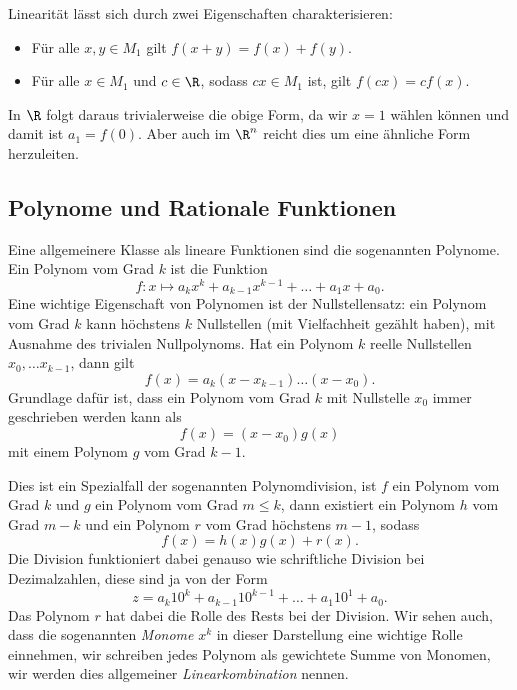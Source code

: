 \documentclass[letterpaper,10pt,english]{jupyterBook}
\begin{document}
Linearität lässt sich durch zwei Eigenschaften charakterisieren:
\begin{itemize}
\item {} 
Für alle \(x,y \in M_1\) gilt \(f(x+y)=f(x) + f(y) \).

\item {} 
Für alle \(x \in M_1\) und \(c \in \R\), sodass \(cx \in M_1\) ist, gilt \(f(cx) = c f(x)\).

\end{itemize}

In \(\R\) folgt daraus trivialerweise die obige Form, da wir \(x=1\) wählen können und damit ist \(a_1 = f(0)\). Aber auch im \(\R^n\) reicht dies um eine ähnliche Form herzuleiten.


\subsection{Polynome und Rationale Funktionen}
\label{\detokenize{vorkurs/funktionen:polynome-und-rationale-funktionen}}
Eine allgemeinere Klasse als lineare Funktionen sind die sogenannten Polynome. Ein Polynom vom Grad \(k\) ist die Funktion
\begin{equation*}
 f:x\mapsto a_k x^k + a_{k-1}x^{k-1} + \ldots + a_1 x + a_0.\end{equation*}
Eine wichtige Eigenschaft von Polynomen ist der Nullstellensatz: ein Polynom vom Grad \(k\) kann höchstens \(k\) Nullstellen (mit Vielfachheit gezählt haben), mit Ausnahme des trivialen Nullpolynoms. Hat ein Polynom \(k\) reelle Nullstellen \(x_0, \ldots x_{k-1}\), dann gilt
\begin{equation*}
 f(x) = a_k (x - x_{k-1}) \ldots (x-x_0).\end{equation*}
Grundlage dafür ist, dass ein Polynom vom Grad \(k\) mit Nullstelle \(x_0\) immer geschrieben werden kann als
\begin{equation*}
 f(x) = (x-x_0) g(x)\end{equation*}
mit einem Polynom \(g\) vom Grad \(k-1\).

Dies ist ein Spezialfall der sogenannten Polynomdivision, ist \(f\) ein Polynom vom Grad \(k\) und \(g\) ein Polynom vom Grad \(m \leq k\), dann existiert ein Polynom \(h\) vom Grad \(m-k\) und ein Polynom \(r\) vom Grad höchstens \(m-1\), sodass
\begin{equation*}
 f(x) = h(x) g(x) + r(x).
\end{equation*}
Die Division funktioniert dabei genauso wie schriftliche Division bei Dezimalzahlen, diese sind ja von der Form
\begin{equation*}
z = a_k 10^k + a_{k-1} 10^{k-1} + \ldots + a_1 10^1 + a_0.\end{equation*}
Das Polynom \(r\) hat dabei die Rolle des Rests bei der Division.  Wir sehen auch, dass die sogenannten \emph{Monome} \(x^k\) in dieser Darstellung eine wichtige Rolle einnehmen, wir schreiben jedes Polynom als gewichtete Summe von Monomen, wir werden dies allgemeiner \emph{Linearkombination} nennen.
\end{document}
